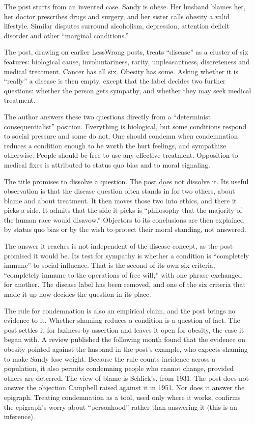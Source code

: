 \begin{afterword}
\summaryhead

The post starts from an invented case. Sandy is obese. Her husband blames her, her doctor prescribes drugs and surgery, and her sister calls obesity a valid lifestyle. Similar disputes surround alcoholism, depression, attention deficit disorder and other ``marginal conditions.''

The post, drawing on earlier LessWrong posts, treats ``disease'' as a cluster of six features: biological cause, involuntariness, rarity, unpleasantness, discreteness and medical treatment. Cancer has all six. Obesity has some. Asking whether it is ``really'' a disease is then empty, except that the label decides two further questions: whether the person gets sympathy, and whether they may seek medical treatment.

The author answers these two questions directly from a ``determinist consequentialist'' position. Everything is biological, but some conditions respond to social pressure and some do not. One should condemn when condemnation reduces a condition enough to be worth the hurt feelings, and sympathize otherwise. People should be free to use any effective treatment. Opposition to medical fixes is attributed to status quo bias and to moral signaling.

\responsehead

The title promises to dissolve a question. The post does not dissolve it. Its useful observation is that the disease question often stands in for two others, about blame and about treatment. It then moves those two into ethics, and there it picks a side. It admits that the side it picks is ``philosophy that the majority of the human race would disavow.'' Objectors to its conclusions are then explained by status quo bias or by the wish to protect their moral standing, not answered.

The answer it reaches is not independent of the disease concept, as the post promised it would be. Its test for sympathy is whether a condition is ``completely immune'' to social influence. That is the second of its own six criteria, ``completely immune to the operations of free will,'' with one phrase exchanged for another. The disease label has been removed, and one of the six criteria that made it up now decides the question in its place.

The rule for condemnation is also an empirical claim, and the post brings no evidence to it. Whether shaming reduces a condition is a question of fact. The post settles it for laziness by assertion and leaves it open for obesity, the case it began with. A review published the following month found that the evidence on obesity pointed against the husband in the post's example, who expects shaming to make Sandy lose weight. Because the rule counts incidence across a population, it also permits condemning people who cannot change, provided others are deterred. The view of blame is Schlick's, from 1931. The post does not answer the objection Campbell raised against it in 1951. Nor does it answer the epigraph. Treating condemnation as a tool, used only where it works, confirms the epigraph's worry about ``personhood'' rather than answering it (this is an inference).


\end{afterword}

